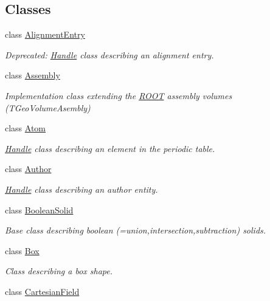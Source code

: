 \subsection*{Classes}
\begin{DoxyCompactItemize}
\item 
class \hyperlink{class_d_d4hep_1_1_geometry_1_1_alignment_entry}{Alignment\+Entry}
\begin{DoxyCompactList}\small\item\em Deprecated\+: \hyperlink{class_d_d4hep_1_1_handle}{Handle} class describing an alignment entry. \end{DoxyCompactList}\item 
class \hyperlink{class_d_d4hep_1_1_geometry_1_1_assembly}{Assembly}
\begin{DoxyCompactList}\small\item\em Implementation class extending the \hyperlink{namespace_r_o_o_t}{R\+O\+OT} assembly volumes (T\+Geo\+Volume\+Asembly) \end{DoxyCompactList}\item 
class \hyperlink{class_d_d4hep_1_1_geometry_1_1_atom}{Atom}
\begin{DoxyCompactList}\small\item\em \hyperlink{class_d_d4hep_1_1_handle}{Handle} class describing an element in the periodic table. \end{DoxyCompactList}\item 
class \hyperlink{class_d_d4hep_1_1_geometry_1_1_author}{Author}
\begin{DoxyCompactList}\small\item\em \hyperlink{class_d_d4hep_1_1_handle}{Handle} class describing an author entity. \end{DoxyCompactList}\item 
class \hyperlink{class_d_d4hep_1_1_geometry_1_1_boolean_solid}{Boolean\+Solid}
\begin{DoxyCompactList}\small\item\em Base class describing boolean (=union,intersection,subtraction) solids. \end{DoxyCompactList}\item 
class \hyperlink{class_d_d4hep_1_1_geometry_1_1_box}{Box}
\begin{DoxyCompactList}\small\item\em Class describing a box shape. \end{DoxyCompactList}\item 
class \hyperlink{class_d_d4hep_1_1_geometry_1_1_cartesian_field}{Cartesian\+Field}

\end{DoxyCompactItemize}
